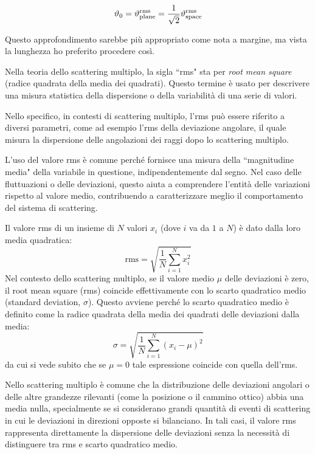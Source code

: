\begin{equation*}
    \vartheta_0=\vartheta_{\rm plane}^{\rm rms}
    =\frac{1}{\sqrt{2}} \vartheta_{\rm space}^{\rm rms}
\end{equation*}

\begin{approfondimento}\label{appr:rms}
    \footnotesize
    Questo approfondimento sarebbe più appropriato come nota a margine, ma vista la lunghezza ho preferito procedere così.

    \vspace{0.2cm}Nella teoria dello scattering multiplo, la sigla ``rms" sta per \textit{root mean square} (radice quadrata della media dei quadrati). Questo termine è usato per descrivere una misura statistica della dispersione o della variabilità di una serie di valori.

    Nello specifico, in contesti di scattering multiplo, l'rms può essere riferito a diversi parametri, come ad esempio l'rms della deviazione angolare, il quale misura la dispersione delle angolazioni dei raggi dopo lo scattering multiplo.
    
    L'uso del valore rms è comune perché fornisce una misura della ``magnitudine media" della variabile in questione, indipendentemente dal segno. Nel caso delle fluttuazioni o delle deviazioni, questo aiuta a comprendere l'entità delle variazioni rispetto al valore medio, contribuendo a caratterizzare meglio il comportamento del sistema di scattering.
    
    Il valore rms di un insieme di $N$ valori $x_i$ (dove $i$ va da $1$ a $N$) è dato dalla loro media quadratica:
    \begin{equation*}
        \textstyle \text{rms}
        =\sqrt{\frac{1}{N}\sum_{i=1}^{N} x_i^2}
    \end{equation*}
    Nel contesto dello scattering multiplo, se il valore medio $\mu$ delle deviazioni è zero, il root mean square (rms) coincide effettivamente con lo scarto quadratico medio (standard deviation, $\sigma$). Questo avviene perché lo scarto quadratico medio è definito come la radice quadrata della media dei quadrati delle deviazioni dalla media:
    \begin{equation*}
        \textstyle \sigma
        =\sqrt{\frac{1}{N}\sum_{i=1}^{N} (x_i - \mu)^2}
    \end{equation*}
    da cui si vede subito che se $\mu=0$ tale espressione coincide con quella dell'rms.
    
    Nello scattering multiplo è comune che la distribuzione delle deviazioni angolari o delle altre grandezze rilevanti (come la posizione o il cammino ottico) abbia una media nulla, specialmente se si considerano grandi quantità di eventi di scattering in cui le deviazioni in direzioni opposte si bilanciano. In tali casi, il valore rms rappresenta direttamente la dispersione delle deviazioni senza la necessità di distinguere tra rms e scarto quadratico medio.
\end{approfondimento}

